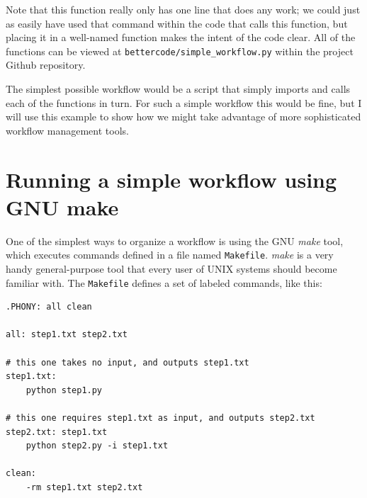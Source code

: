 Note that this function really only has one line that does any work; we could just as easily have used that command within the code that calls this function, but placing it in a well-named function makes the intent of the code clear.  All of the functions can be viewed at \texttt{bettercode/simple\_workflow.py} within the project Github repository.  

The simplest possible workflow would be a script that simply imports and calls each of the functions in turn. For such a simple workflow this would be fine, but I will use this example to show how we might take advantage of more sophisticated workflow management tools.

\section{Running a simple workflow using GNU make}

One of the simplest ways to organize a workflow is using the GNU \textit{make} tool, which executes commands defined in a file named \texttt{Makefile}.  \textit{make} is a very handy general-purpose tool that every user of UNIX systems should become familiar with.  The \texttt{Makefile} defines a set of labeled commands, like this:

\begin{lstlisting}[style=makefile]
.PHONY: all clean

all: step1.txt step2.txt

# this one takes no input, and outputs step1.txt
step1.txt:
    python step1.py

# this one requires step1.txt as input, and outputs step2.txt
step2.txt: step1.txt
    python step2.py -i step1.txt

clean:
    -rm step1.txt step2.txt
\end{lstlisting}


